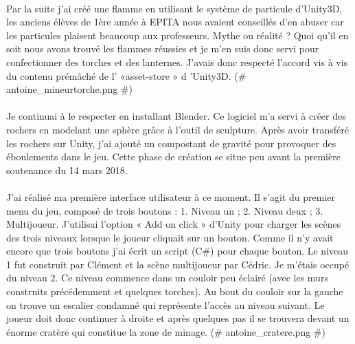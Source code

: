 \documentclass[titlepage, 13px, a4paper]{report}
\begin{document}
\paragraph{} \hspace{0pt} 
Par la suite j'ai créé une flamme en utilisant le système de particule d'Unity3D, les
anciens élèves de 1ère année à EPITA nous avaient conseillés d'en abuser car les
particules plaisent beaucoup aux professeurs. Mythe ou réalité ? Quoi qu'il en soit
nous avons trouvé les flammes réussies et je m'en suis donc servi pour
confectionner des torches et des lanternes. J'avais donc respecté l'accord vis à vis
du contenu prémâché de l' «asset-store » d 'Unity3D. \@(\# antoine\_mineurtorche.png \#)\@ \\


\paragraph{} \hspace{0pt} 
Je continuai à le respecter en installant Blender. Ce logiciel m'a servi à créer des
rochers en modelant une sphère grâce à l'outil de sculpture. Après avoir transféré
les rochers sur Unity, j'ai ajouté un compostant de gravité pour provoquer des
éboulements dans le jeu. Cette phase de création se situe peu avant la première
soutenance du 14 mars 2018. \\


\paragraph{} \hspace{0pt} 
J'ai réalisé ma première interface utilisateur à ce moment. Il s'agit du premier menu
du jeu, composé de trois boutons : 1. Niveau un ; 2. Niveau deux ; 3. Multijoueur.
J'utilisai l'option « Add on click » d'Unity pour charger les scènes des trois niveaux
lorsque le joueur cliquait sur un bouton. Comme il n'y avait encore que trois
boutons j'ai écrit un script (C\#) pour chaque bouton. Le niveau 1 fut construit par
Clément et la scène multijoueur par Cédric. Je m'étais occupé du niveau 2. Ce
niveau commence dans un couloir peu éclairé (avec les murs construits
précédemment et quelques torches). Au bout du couloir sur la gauche on trouve un
escalier condamné qui représente l'accès au niveau suivant. Le joueur doit donc
continuer à droite et après quelques pas il se trouvera devant un énorme cratère
qui constitue la zone de minage. \@(\# antoine\_cratere.png \#)\@   \\
\end{document}
